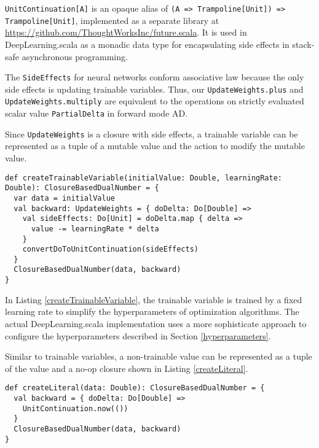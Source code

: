 \lstinline{UnitContinuation[A]} is an opaque alias \cite{erik2017opaque} of \lstinline{(A => Trampoline[Unit]) => Trampoline[Unit]}, implemented as a separate library at \url{https://github.com/ThoughtWorksInc/future.scala}. It is used in DeepLearning.scala as a monadic data type for encapsulating side effects in stack-safe asynchronous programming.

The \lstinline{SideEffects} for neural networks conform associative law because the only side effects is updating \glspl{trainable variable}. Thus, our \lstinline{UpdateWeights.plus} and \lstinline{UpdateWeights.multiply} are equivalent to the operations on strictly evaluated scalar value \lstinline{PartialDelta} in forward mode AD.

Since \lstinline{UpdateWeights} is a closure with side effects, a \gls{trainable variable} can be represented as a tuple of a mutable value and the action to modify the mutable value.

\begin{lstlisting}[float={htbp},caption={Create a dual number for a \gls{trainable variable}}, label={createTrainableVariable}]
def createTrainableVariable(initialValue: Double, learningRate: Double): ClosureBasedDualNumber = {
  var data = initialValue
  val backward: UpdateWeights = { doDelta: Do[Double] =>
    val sideEffects: Do[Unit] = doDelta.map { delta =>
      value -= learningRate * delta
    }
    convertDoToUnitContinuation(sideEffects)
  }
  ClosureBasedDualNumber(data, backward)
}
\end{lstlisting}

In Listing \ref{createTrainableVariable}, the \gls{trainable variable} is trained by a fixed learning rate to simplify the hyperparameters of optimization algorithms. The actual DeepLearning.scala implementation uses a more sophisticate approach to configure the hyperparameters described in Section \ref{hyperparameters}.

Similar to \glspl{trainable variable}, a non-trainable value can be represented as a tuple of the value and a no-op closure shown in Listing \ref{createLiteral}.

\begin{lstlisting}[float={htbp},caption={Create a dual number for a  non-trainable value}, label={createLiteral}]
def createLiteral(data: Double): ClosureBasedDualNumber = {
  val backward = { doDelta: Do[Double] =>
    UnitContinuation.now(())
  }
  ClosureBasedDualNumber(data, backward)
}
\end{lstlisting}

